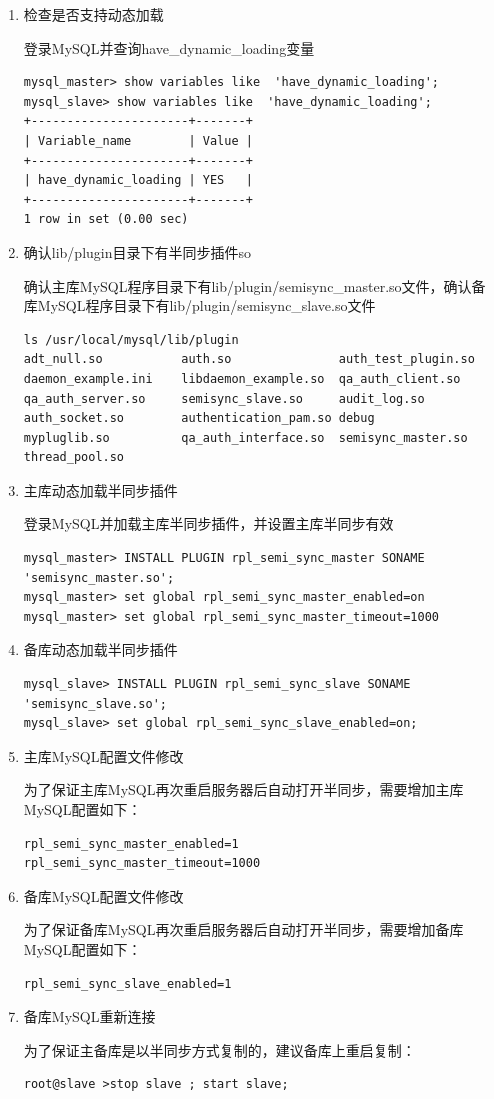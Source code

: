 \begin{enumerate}[itemsep=0pt,parsep=0pt]
\item 检查是否支持动态加载

登录MySQL并查询have\_dynamic\_loading变量
\begin{verbatim}
mysql_master> show variables like  'have_dynamic_loading';
mysql_slave> show variables like  'have_dynamic_loading';
+----------------------+-------+
| Variable_name        | Value |
+----------------------+-------+
| have_dynamic_loading | YES   |
+----------------------+-------+
1 row in set (0.00 sec)
\end{verbatim}
\item 确认lib/plugin目录下有半同步插件so

  确认主库MySQL程序目录下有lib/plugin/semisync\_master.so文件，确认备
  库MySQL程序目录下有lib/plugin/semisync\_slave.so文件

\begin{verbatim}
ls /usr/local/mysql/lib/plugin
adt_null.so           auth.so               auth_test_plugin.so    
daemon_example.ini    libdaemon_example.so  qa_auth_client.so     
qa_auth_server.so     semisync_slave.so     audit_log.so          
auth_socket.so        authentication_pam.so debug               
mypluglib.so          qa_auth_interface.so  semisync_master.so
thread_pool.so
\end{verbatim}

\item 主库动态加载半同步插件

登录MySQL并加载主库半同步插件，并设置主库半同步有效
\begin{verbatim}
mysql_master> INSTALL PLUGIN rpl_semi_sync_master SONAME 'semisync_master.so';
mysql_master> set global rpl_semi_sync_master_enabled=on
mysql_master> set global rpl_semi_sync_master_timeout=1000
\end{verbatim}
\item 备库动态加载半同步插件
\begin{verbatim}
mysql_slave> INSTALL PLUGIN rpl_semi_sync_slave SONAME 'semisync_slave.so';
mysql_slave> set global rpl_semi_sync_slave_enabled=on; 
\end{verbatim}
\item 主库MySQL配置文件修改

为了保证主库MySQL再次重启服务器后自动打开半同步，需要增加主库MySQL配置如下：
\begin{verbatim}
rpl_semi_sync_master_enabled=1
rpl_semi_sync_master_timeout=1000
\end{verbatim}
\item 备库MySQL配置文件修改

为了保证备库MySQL再次重启服务器后自动打开半同步，需要增加备库MySQL配置如下：
\begin{verbatim}
rpl_semi_sync_slave_enabled=1
\end{verbatim}
\item 备库MySQL重新连接

为了保证主备库是以半同步方式复制的，建议备库上重启复制：
\begin{verbatim}
root@slave >stop slave ; start slave;
\end{verbatim}
\end{enumerate}

